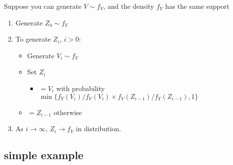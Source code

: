      Suppose you can generate $V \sim f_V$, and the density $f_Y$
     has the same support
\begin{enumerate}
\item Generate $Z_0 \sim f_V$
\item To generate $Z_i$, $i > 0$:
\begin{itemize}
\item Generate $V_i \sim f_V$
\item Set $Z_i$
\begin{itemize}
\item $= V_i$ with probability $\min\{ f_Y(V_i)/ f_V(V_i)
            \times f_V(Z_{i-1}) / f_Y(Z_{i-1}), 1\}$
\end{itemize}
\item $= Z_{i-1}$ otherwise
\end{itemize}
\item As $i \to \infty$, $Z_i \to f_Y$ in distribution.
\end{enumerate}

\subsection{simple example}

